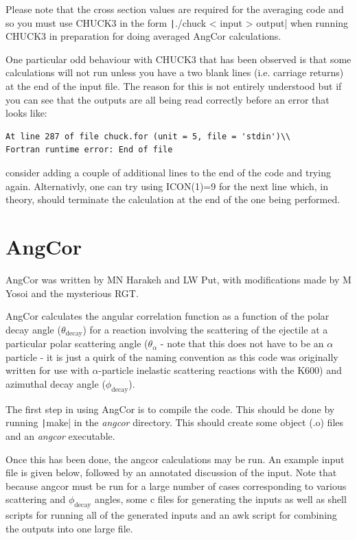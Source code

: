 \documentclass[a4paper,10pt]{article}
\begin{document}
Please note that the cross section values are required for the averaging code and so you must use CHUCK3 in the form \texttt|./chuck < input > output| when running CHUCK3 in preparation for doing averaged AngCor calculations.

One particular odd behaviour with CHUCK3 that has been observed is that some calculations will not run unless you have a two blank lines (i.e. carriage returns) at the end of the input file. The reason for this is not entirely understood but if you can see that the outputs are all being read correctly before an error that looks like:\\
\begin{verbatim}
At line 287 of file chuck.for (unit = 5, file = 'stdin')\\
Fortran runtime error: End of file 
\end{verbatim}
consider adding a couple of additional lines to the end of the code and trying again. Alternativly, one can try using ICON(1)=9 for the next line which, in theory, should terminate the calculation at the end of the one being performed.

\section{AngCor}

AngCor was written by MN Harakeh and LW Put, with modifications made by M Yosoi and the mysterious RGT.

AngCor calculates the angular correlation function as a function of the polar decay angle ($\theta_{\mathrm{decay}}$) for a reaction involving the scattering of the ejectile at a particular polar scattering angle ($\theta_{\alpha}$ - note that this does not have to be an $\alpha$ particle - it is just a quirk of the naming convention as this code was originally written for use with $\alpha$-particle inelastic scattering reactions with the K600) and azimuthal decay angle ($\phi_{\mathrm{decay}}$).

The first step in using AngCor is to compile the code. This should be done by running \texttt|make| in the {\it angcor} directory. This should create some object (.o) files and an {\it angcor} executable.

Once this has been done, the angcor calculations may be run. An example input file is given below, followed by an annotated discussion of the input. Note that because angcor must be run for a large number of cases corresponding to various scattering and $\phi_\mathrm{decay}$ angles, some c files for generating the inputs as well as shell scripts for running all of the generated inputs and an awk script for combining the outputs into one large file.
\end{document}
